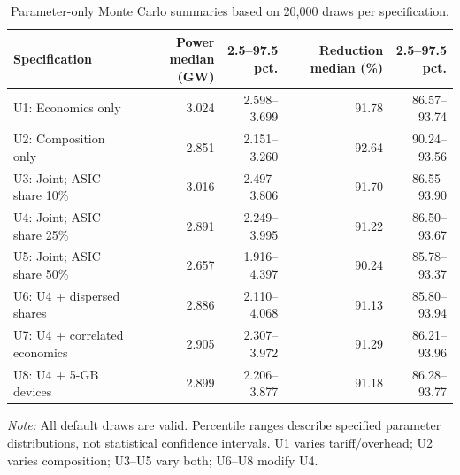 \begin{table}[htbp]
\centering
\small
\caption{Parameter-only Monte Carlo summaries based on 20,000 draws per specification.}
\label{tab:mc_summary}
\begin{tabular}{lrrrr}
\toprule
Specification & Power median (GW) & 2.5--97.5 pct. & Reduction median (\%) & 2.5--97.5 pct. \\
\midrule
U1: Economics only & 3.024 & 2.598--3.699 & 91.78 & 86.57--93.74 \\
U2: Composition only & 2.851 & 2.151--3.260 & 92.64 & 90.24--93.56 \\
U3: Joint; ASIC share 10\% & 3.016 & 2.497--3.806 & 91.70 & 86.55--93.90 \\
U4: Joint; ASIC share 25\% & 2.891 & 2.249--3.995 & 91.22 & 86.50--93.67 \\
U5: Joint; ASIC share 50\% & 2.657 & 1.916--4.397 & 90.24 & 85.78--93.37 \\
U6: U4 + dispersed shares & 2.886 & 2.110--4.068 & 91.13 & 85.80--93.94 \\
U7: U4 + correlated economics & 2.905 & 2.307--3.972 & 91.29 & 86.21--93.96 \\
U8: U4 + 5-GB devices & 2.899 & 2.206--3.877 & 91.18 & 86.28--93.77 \\
\bottomrule
\end{tabular}
\par\smallskip
\begin{minipage}{\linewidth}
\footnotesize
\textit{Note:} All default draws are valid. Percentile ranges describe specified parameter distributions, not statistical confidence intervals. U1 varies tariff/overhead; U2 varies composition; U3--U5 vary both; U6--U8 modify U4.
\end{minipage}
\end{table}
